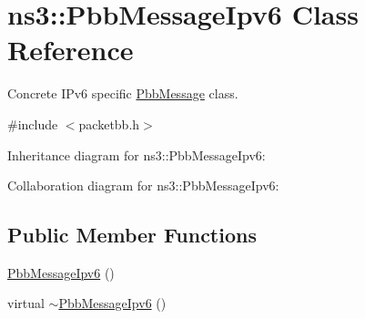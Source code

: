 \hypertarget{classns3_1_1PbbMessageIpv6}{}\section{ns3\+:\+:Pbb\+Message\+Ipv6 Class Reference}
\label{classns3_1_1PbbMessageIpv6}


Concrete I\+Pv6 specific \hyperlink{classns3_1_1PbbMessage}{Pbb\+Message} class.  




{\ttfamily \#include $<$packetbb.\+h$>$}



Inheritance diagram for ns3\+:\+:Pbb\+Message\+Ipv6\+:


Collaboration diagram for ns3\+:\+:Pbb\+Message\+Ipv6\+:
\subsection*{Public Member Functions}
\begin{DoxyCompactItemize}
\item 
\hyperlink{classns3_1_1PbbMessageIpv6_a570510c5cf00fb66fdb061a7dc6454da}{Pbb\+Message\+Ipv6} ()
\item 
virtual \hyperlink{classns3_1_1PbbMessageIpv6_af39ca42d03c127fb48acc7dbafd8f059}{$\sim$\+Pbb\+Message\+Ipv6} ()
\end{DoxyCompactItemize}
